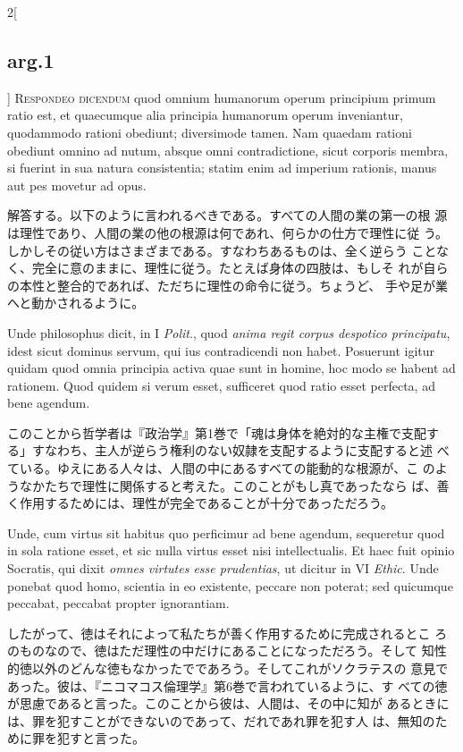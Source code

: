 \documentclass[paper=a4paper,fontsize=10pt,jafontsize=9pt,titlepage]{jlreq}
\begin{document}
\begin{paracol}{2}[\subsection{arg.1}]
{\scshape Respondeo dicendum} quod omnium humanorum operum principium
 primum ratio est, et quaecumque alia principia humanorum operum
 inveniantur, quodammodo rationi obediunt; diversimode tamen. Nam
 quaedam rationi obediunt omnino ad nutum, absque omni contradictione,
 sicut corporis membra, si fuerint in sua natura consistentia; statim
 enim ad imperium rationis, manus aut pes movetur ad opus.

\switchcolumn

解答する。以下のように言われるべきである。すべての人間の業の第一の根
 源は理性であり、人間の業の他の根源は何であれ、何らかの仕方で理性に従
 う。しかしその従い方はさまざまである。すなわちあるものは、全く逆らう
 ことなく、完全に意のままに、理性に従う。たとえば身体の四肢は、もしそ
 れが自らの本性と整合的であれば、ただちに理性の命令に従う。ちょうど、
 手や足が業へと動かされるように。

\switchcolumn*

Unde philosophus dicit, in I {\itshape Polit}., quod {\itshape anima
 regit corpus despotico principatu}, idest sicut dominus servum, qui
 ius contradicendi non habet. Posuerunt igitur quidam quod omnia
 principia activa quae sunt in homine, hoc modo se habent ad
 rationem. Quod quidem si verum esset, sufficeret quod ratio esset
 perfecta, ad bene agendum.

\switchcolumn

このことから哲学者は『政治学』第1巻で「魂は身体を絶対的な主権で支配す
 る」すなわち、主人が逆らう権利のない奴隷を支配するように支配すると述
 べている。ゆえにある人々は、人間の中にあるすべての能動的な根源が、こ
 のようなかたちで理性に関係すると考えた。このことがもし真であったなら
 ば、善く作用するためには、理性が完全であることが十分であっただろう。

\switchcolumn*

Unde, cum virtus sit habitus quo perficimur ad bene agendum,
 sequeretur quod in sola ratione esset, et sic nulla virtus esset nisi
 intellectualis. Et haec fuit opinio Socratis, qui dixit {\itshape
 omnes virtutes esse prudentias}, ut dicitur in VI {\itshape
 Ethic}. Unde ponebat quod homo, scientia in eo existente, peccare non
 poterat; sed quicumque peccabat, peccabat propter ignorantiam.

\switchcolumn

したがって、徳はそれによって私たちが善く作用するために完成されるとこ
 ろのものなので、徳はただ理性の中だけにあることになっただろう。そして
 知性的徳以外のどんな徳もなかったでであろう。そしてこれがソクラテスの
 意見であった。彼は、『ニコマコス倫理学』第6巻で言われているように、す
 べての徳が思慮であると言った。このことから彼は、人間は、その中に知が
 あるときには、罪を犯すことができないのであって、だれであれ罪を犯す人
 は、無知のために罪を犯すと言った。


\end{paracol}
\end{document}
